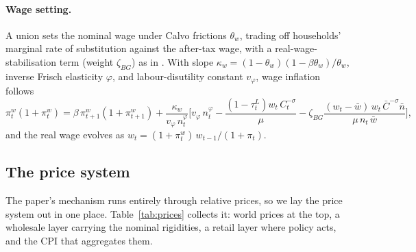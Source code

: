\paragraph{Wage setting.}
A union sets the nominal wage under Calvo frictions $\theta_w$, trading off
households' marginal rate of substitution against the after-tax wage, with a
real-wage-stabilisation term (weight $\zeta_{BG}$) as in
\citet{auclert2023energy}. With slope $\kappa_w=(1-\theta_w)(1-\beta\theta_w)/\theta_w$,
inverse Frisch elasticity $\varphi$, and labour-disutility constant $v_\varphi$,
wage inflation follows
%
\begin{equation}
\pi^w_t(1+\pi^w_t)
= \beta\,\pi^w_{t+1}(1+\pi^w_{t+1})
+ \frac{\kappa_w}{v_\varphi\,n_t^{\varphi}}
\biggl[v_\varphi\,n_t^{\varphi}
- \frac{(1-\tau^L_t)w_t\,C_t^{-\sigma}}{\mu}
- \zeta_{BG}\frac{(w_t-\bar w)\,w_t\,\bar C^{-\sigma}\bar n}{\mu\,n_t\,\bar w}\biggr],
\label{eq:wpc}
\end{equation}
%
and the real wage evolves as $w_t=(1+\pi^w_t)\,w_{t-1}/(1+\pi_t)$.

\subsection{The price system}\label{sec:prices}

The paper's mechanism runs entirely through relative prices, so we lay the price
system out in one place. Table~\ref{tab:prices} collects it: world prices at the
top, a wholesale layer carrying the nominal rigidities, a retail layer where
policy acts, and the CPI that aggregates them.

